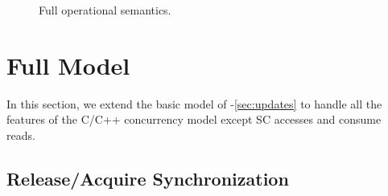 {\begin{landscape}
\begin{figure*}[t]
\caption{Full operational semantics.}
\label{fig:full-opsem-a}
\end{figure*}
\end{landscape}
\restoregeometry
}


\section{Full Model}
\label{sec:full}

In this section, we extend the basic model of
-\ref{sec:updates} to handle all the
features of the C/C++ concurrency model except SC accesses and consume reads.


\subsection{Release/Acquire Synchronization}
\label{sec:relacq}

